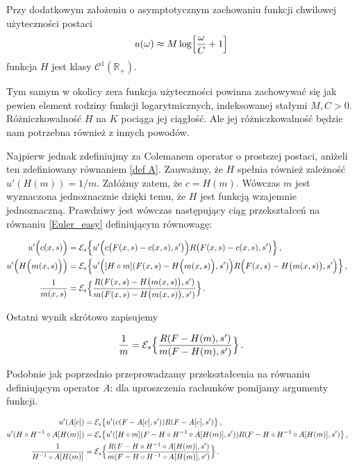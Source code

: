 \begin{lemat}\label{u asymptotically} Przy dodatkowym założeniu o asymptotycznym zachowaniu funkcji chwilowej użyteczności postaci
   \begin{equation}
   u(\omega) \approx M \log \Bigl[ \frac{\omega}{C} + 1 \Bigl]
   \end{equation}	
	funkcja $ H $ jest klasy $ \mathcal{C}^{1}(\mathbb{R}_{+}) $.
\end{lemat}

Tym samym w okolicy zera funkcja użyteczności powinna zachowywać się jak pewien element rodziny funkcji logarytmicznych, indeksowanej stałymi $ M,C > 0$. Różniczkowalność $ H $ na $ K $ pociąga jej ciągłość. Ale jej różniczkowalność będzie nam potrzebna również z innych powodów.

Najpierw jednak zdefiniujmy za Colemanem operator o prostszej postaci, aniżeli ten zdefiniowany równaniem \ref{def A}. Zauważmy, że $ H $ spełnia również zależność $ u'(H(m)) = 1/m $. Załóżmy zatem, że $ c = H(m) $. Wówczas $ m $ jest wyznaczona jednoznacznie dzięki temu, że $ H $ jest funkcją wzajemnie jednoznaczną. Prawdziwy jest wówczas następujący ciąg przekształceń na równaniu \ref{Euler_easy} definiującym równowagę:

\begin{align*}
\begin{split}
u'\Big(c(x,s)\Big) 	&=   \mathcal{E}_s \Bigl \{ u'\Bigl(c\big(F(x,s)-c(x,s), s'\big)\Bigl)R\big(F(x,s)-c(x,s), s'\big)	\Bigl \} \,,\cr
u'\Bigl(H\Big(m(x,s)\Big)\Bigl)&=   \mathcal{E}_s \Bigl \{ u'\Big([H \circ m](F(x,s)-H\Big(m(x,s)\Big), s')\Big)R\Big(F(x,s)-H\big(m(x,s)\big),s'\Big)	\Bigl \} \,,\cr
\frac{1}{m(x,s)} &=   \mathcal{E}_s \Bigl \{ \frac{R(F(x,s)-H\big(m(x,s)\big),s')}{m(F(x,s)-H\big(m(x,s)\big), s')}	\Bigl \} \,.\cr	
\end{split}
\end{align*} 
 
	Ostatni wynik skrótowo zapisujemy 

\begin{equation*}
	\frac{1}{m} =   \mathcal{E}_s \Bigl \{ \frac{R(F - H(m),s')}{m(F - H(m), s')}	\Bigl \} \,.
\end{equation*}	
	 
Podobnie jak poprzednio przeprowadzamy przekształcenia na równaniu definiującym operator $ A $: dla uproszczenia rachunków pomijamy argumenty funkcji.

\begin{align*}
\begin{split}
	u'(A[c]) &=   \mathcal{E}_s \bigl \{ u'(c(F-A[c],s'))R(F-A[c],s')	\bigl \} \,,\cr
	u'(H \circ H^{-1} \circ A[H(m)]) &=   \mathcal{E}_s \bigl \{ u'([H\circ m](F-H \circ H^{-1} \circ A[H(m)],s'))R(F-H \circ H^{-1} \circ A[H(m)],s')	\bigl \} \,,\cr
	\frac{1}{H^{-1} \circ A[H(m)]} &=   \mathcal{E}_s \Bigl \{ \frac{R(F-H \circ H^{-1} \circ A[H(m)],s')}{m(F-H \circ H^{-1} \circ A[H(m)], s')}	\Bigl \}\,.\cr	
\end{split}
\end{align*}
 
